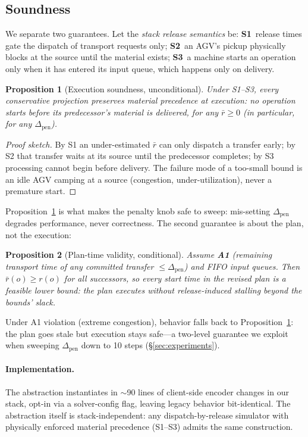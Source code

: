 \documentclass[twocolumn]{article}
\newtheorem{proposition}{Proposition}
\begin{document}
\subsection{Soundness}
\label{sec:sound}
We separate two guarantees. Let the \emph{stack release semantics} be:
\textbf{S1}~release times gate the dispatch of transport requests only;
\textbf{S2}~an AGV's pickup physically blocks at the source until the
material exists; \textbf{S3}~a machine starts an operation only when it
has entered its input queue, which happens only on delivery.

\begin{proposition}[Execution soundness, unconditional]
\label{prop:exec}
Under S1--S3, every conservative projection preserves material
precedence at execution: no operation starts before its predecessor's
material is delivered, for \emph{any} $\bar r\ge 0$ (in particular, for
any $\Delta_{\mathrm{pen}}$).
\end{proposition}
\begin{proof}[Proof sketch]
By S1 an under-estimated $\bar r$ can only dispatch a transfer early;
by S2 that transfer waits at its source until the predecessor
completes; by S3 processing cannot begin before delivery. The failure
mode of a too-small bound is an idle AGV camping at a source
(congestion, under-utilization), never a premature start.
\end{proof}

Proposition~\ref{prop:exec} is what makes the penalty knob safe to
sweep: mis-setting $\Delta_{\mathrm{pen}}$ degrades performance, never
correctness. The second guarantee is about the plan, not the execution:

\begin{proposition}[Plan-time validity, conditional]
\label{prop:plan}
Assume \textbf{A1} (remaining transport time of any committed transfer
$\le\Delta_{\mathrm{pen}}$) and FIFO input queues. Then
$\bar r(o)\ge r(o)$ for all successors, so every start time in the
revised plan is a feasible lower bound: the plan executes without
release-induced stalling beyond the bounds' slack.
\end{proposition}

Under A1 violation (extreme congestion), behavior falls back to
Proposition~\ref{prop:exec}: the plan goes stale but execution stays
safe---a two-level guarantee we exploit when sweeping
$\Delta_{\mathrm{pen}}$ down to 10 steps (\S\ref{sec:experiments}).

\paragraph{Implementation.}
The abstraction instantiates in $\sim$90 lines of client-side encoder
changes in our stack, opt-in via a solver-config flag, leaving legacy
behavior bit-identical. The abstraction itself is stack-independent:
any dispatch-by-release simulator with physically enforced material
precedence (S1--S3) admits the same construction.
\end{document}
